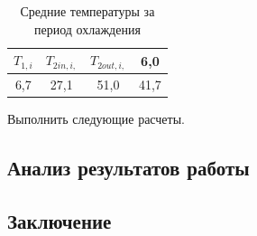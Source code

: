 \documentclass[12pt, a4paper]{article}
\begin{document}
\begin{table}[htbp]
\caption{Средние температуры за период охлаждения}
\begin{center}
\begin{tabular}{| c | c | c | c |}
 \hline
$T_{1,i}$ & $T_{2 in, i,}$ & $T_{2 out, i,}$ & 6,0 \\
 \hline
6,7 & 27,1 & 51,0 & 41,7 \\
  \hline
\end{tabular}
\end{center}
\end{table}

\begin{flushleft}
Выполнить следующие расчеты.
\end{flushleft}

\begin{center}
\subsection*{Анализ результатов работы}
\end{center}
 

\newpage
\begin{center}
\subsection*{Заключение}
\end{center}
\end{document}
